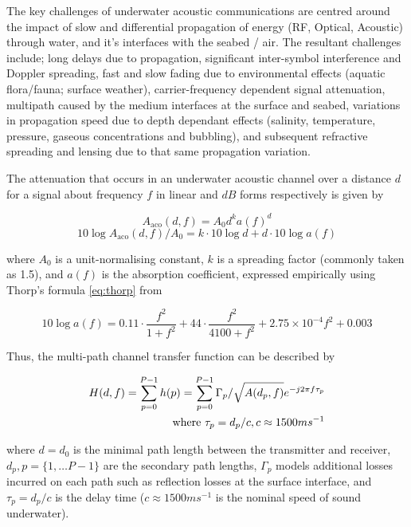 \documentclass[runningheads,a4paper]{llncs}
\begin{document}
The key challenges of underwater acoustic communications are centred around the impact of slow and differential propagation of energy (RF, Optical, Acoustic) through water, and it's interfaces with the seabed / air.
The resultant challenges include; long delays due to propagation, significant inter-symbol interference and Doppler spreading, fast and slow fading due to environmental effects (aquatic flora/fauna; surface weather), carrier-frequency dependent signal attenuation, multipath caused by the medium interfaces at the surface and seabed, variations in propagation speed due to depth dependant effects (salinity, temperature, pressure, gaseous concentrations and bubbling), and subsequent refractive spreading and lensing due to that same propagation variation\cite{Partan2006}.

The attenuation that occurs in an underwater acoustic channel over a distance $d$ for a signal about frequency $f$ in linear and $dB$ forms respectively is given by

\begin{equation}
  \label{eq:acoattenuation}
  A_{\text{aco}}(d,f) = A_0d^ka(f)^d
\end{equation}
\begin{equation}
  \label{eq:acoattenuationdb}
  10 \log A_{\text{aco}}(d,f)/A_0 = k \cdot 10 \log d + d \cdot 10 \log a(f)
\end{equation}

where $A_0$ is a unit-normalising constant, $k$ is a spreading factor (commonly taken as 1.5), and $a(f)$ is the absorption coefficient, expressed empirically using Thorp's formula \eqref{eq:thorp} from \cite{Stojanovic2007}

\begin{equation}
  \label{eq:thorp}
  10 \log a(f) = 0.11 \cdot \frac{f^2}{1+f^2} + 44\cdot\frac{f^2}{4100+f^2}+ 2.75\times10^{-4} f^2 + 0.003
\end{equation}


Thus, the multi-path channel transfer function can be described by 

\begin{align}
  \label{eq:acomultipath}
  H(d,f) =\sum_{p=0}^{P-1} h(p) = \sum_{p=0}^{P-1} \Gamma_p / \sqrt{A(d_p,f)}e^{-j 2 \pi f \tau_p} \\
  \text{where } \tau_p = d_p/c, c \approx 1500 ms^{-1} \notag
\end{align}

where $d=d_0$ is the minimal path length between the transmitter and receiver, $d_p,p=\{1,\dots P-1\}$ are the secondary path lengths, $\Gamma_p$ models additional losses incurred on each path such as reflection losses at the surface interface, and $\tau_p = d_p/c$ is the delay time ($c \approx 1500 ms^{-1}$ is the nominal speed of sound underwater).
\end{document}

